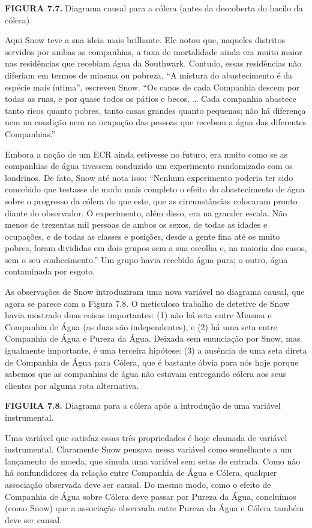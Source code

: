 \documentclass[11pt,a5paper,twoside]{book}
\begin{document}
\textbf{FIGURA 7.7.} Diagrama causal para a cólera (antes da descoberta do bacilo da cólera).

Aqui Snow teve a sua ideia mais brilhante. Ele notou que, naqueles distritos servidos por ambas as companhias, a taxa de mortalidade ainda era muito maior nas residências que recebiam água da Southwark. Contudo, essas residências não diferiam em termos de miasma ou pobreza. “A mistura do abastecimento é da espécie mais íntima”, escreveu Snow. “Os canos de cada Companhia descem por todas as ruas, e por quase todos os pátios e becos. … Cada companhia abastece tanto ricos quanto pobres, tanto casas grandes quanto pequenas; não há diferença nem na condição nem na ocupação das pessoas que recebem a água das diferentes Companhias.”

Embora a noção de um ECR ainda estivesse no futuro, era muito como se as companhias de água tivessem conduzido um experimento randomizado com os londrinos. De fato, Snow até nota isso: “Nenhum experimento poderia ter sido concebido que testasse de modo mais completo o efeito do abastecimento de água sobre o progresso da cólera do que este, que as circunstâncias colocaram pronto diante do observador. O experimento, além disso, era na grander escala. Não menos de trezentas mil pessoas de ambos os sexos, de todas as idades e ocupações, e de todas as classes e posições, desde a gente fina até os muito pobres, foram divididas em dois grupos sem a sua escolha e, na maioria dos casos, sem o seu conhecimento.” Um grupo havia recebido água pura; o outro, água contaminada por esgoto.

As observações de Snow introduziram uma nova variável no diagrama causal, que agora se parece com a Figura 7.8. O meticuloso trabalho de detetive de Snow havia mostrado duas coisas importantes: (1) não há seta entre Miasma e Companhia de Água (as duas são independentes), e (2) há uma seta entre Companhia de Água e Pureza da Água. Deixada sem enunciação por Snow, mas igualmente importante, é uma terceira hipótese: (3) a ausência de uma seta direta de Companhia de Água para Cólera, que é bastante óbvia para nós hoje porque sabemos que as companhias de água não estavam entregando cólera aos seus clientes por alguma rota alternativa.

\textbf{FIGURA 7.8.} Diagrama para a cólera após a introdução de uma variável instrumental.

Uma variável que satisfaz essas três propriedades é hoje chamada de variável instrumental. Claramente Snow pensava nessa variável como semelhante a um lançamento de moeda, que simula uma variável sem setas de entrada. Como não há confundidores da relação entre Companhia de Água e Cólera, qualquer associação observada deve ser causal. Do mesmo modo, como o efeito de Companhia de Água sobre Cólera deve passar por Pureza da Água, concluímos (como Snow) que a associação observada entre Pureza da Água e Cólera também deve ser causal.
\end{document}
